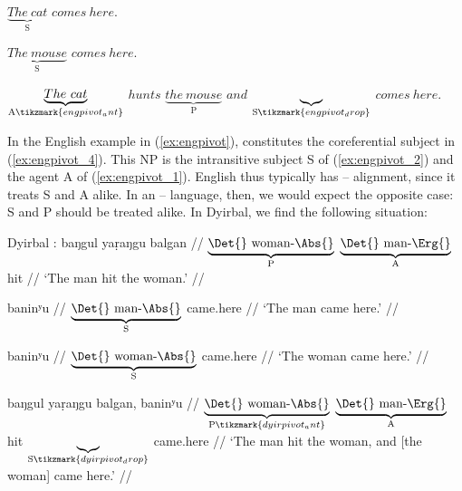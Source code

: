 	\a\label{ex:engpivot_2}%
		$\underbrace{The\ cat}_{\text{S}}$ $comes\ here.$
	
	\a\label{ex:engpivot_3}%
		$\underbrace{The\ mouse}_{\text{S}}$ $comes\ here.$
	
	\a\label{ex:engpivot_4}%
		$\underbrace{The\ cat}_{\text{A}\tikzmark{engpivot_ant}}$
		$hunts$
		$\underbrace{the\ mouse}_{\text{P}}$
		$and$
		$\underbrace{ }_{\text{S}\tikzmark{engpivot_drop}}$
		$comes\ here.$

\xe

In the English example in (\ref{ex:engpivot}),  constitutes the
coreferential subject in (\ref{ex:engpivot_4}). This NP is the intransitive
subject S of (\ref{ex:engpivot_2}) and the agent A of (\ref{ex:engpivot_1}).
English thus typically has \Nom{}--\Acc{} alignment, since it treats S and A
alike. In an \Abs{}--\Erg{} language, then, we would expect the opposite case:
S and P should be treated alike. In Dyirbal, we find the following situation:

\pex\label{ex:dyirpivot}%
Dyirbal \parencite[adapted from][112]{comrie1989}:
\a\label{ex:dyirpivot_1}
	\begingl
		 {baŋgul yaṛaŋgu} balgan //
		\glb $\underbrace{\text{\Det{} woman-\Abs{}}}_{\text{P}}$
			$\underbrace{\text{\Det{} man-\Erg{}}}_{\text{A}}$ hit //
		\glft `The man hit the woman.' //
	\endgl
	
\a\label{ex:dyirpivot_2}%
	\begingl
		 baninʸu //
		\glb $\underbrace{\text{\Det{} man-\Abs{}}}_{\text{S}}$ came.here //
		\glft `The man came here.' //
	\endgl
	
\a\label{ex:dyirpivot_3}%
	\begingl
		 baninʸu //
		\glb $\underbrace{\text{\Det{} woman-\Abs{}}}_{\text{S}}$ 
			came.here //
		\glft `The woman came here.' //
	\endgl
	
\a\label{ex:dyirpivot_4}%
	\begingl[aboveglftskip=1.75em]
		 {baŋgul yaṛaŋgu} balgan, {} baninʸu //
		\glb $\underbrace{\text{\Det{} woman-\Abs{}}}_%
				{\text{P}\tikzmark{dyirpivot_ant}}$
			$\underbrace{\text{\Det{} man-\Erg{}}}_{\text{A}}$
			hit 
			$\underbrace{ }_{\text{S}\tikzmark{dyirpivot_drop}}$
			came.here //
		\glft `The man hit the woman, and [the woman] came here.' //
	\endgl

